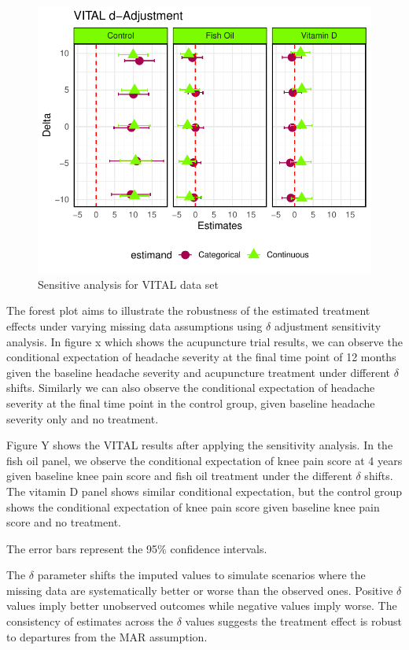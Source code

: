 \documentclass{article}
\newcommand{\pandocbounded}[1]{#1}
\begin{document}
\begin{figure}
\centering
\pandocbounded{\includegraphics[keepaspectratio]{Final_Report_files/figure-latex/unnamed-chunk-43-1.pdf}}
\caption{Sensitive analysis for VITAL data set}
\end{figure}

The forest plot aims to illustrate the robustness of the estimated
treatment effects under varying missing data assumptions using
\(\delta\) adjustment sensitivity analysis. In figure x which shows the
acupuncture trial results, we can observe the conditional expectation of
headache severity at the final time point of 12 months given the
baseline headache severity and acupuncture treatment under different
\(\delta\) shifts. Similarly we can also observe the conditional
expectation of headache severity at the final time point in the control
group, given baseline headache severity only and no treatment.

Figure Y shows the VITAL results after applying the sensitivity
analysis. In the fish oil panel, we observe the conditional expectation
of knee pain score at 4 years given baseline knee pain score and fish
oil treatment under the different \(\delta\) shifts. The vitamin D panel
shows similar conditional expectation, but the control group shows the
conditional expectation of knee pain score given baseline knee pain
score and no treatment.

The error bars represent the 95\% confidence intervals.

The \(\delta\) parameter shifts the imputed values to simulate scenarios
where the missing data are systematically better or worse than the
observed ones. Positive \(\delta\) values imply better unobserved
outcomes while negative values imply worse. The consistency of estimates
across the \(\delta\) values suggests the treatment effect is robust to
departures from the MAR assumption.
\end{document}
